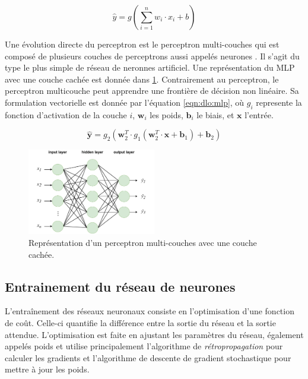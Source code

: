 \begin{equation}
  \label{eqn:dlo:perceptron}
  \hat{y} = g(\sum_{i=1}^{n} w_i \cdot x_i + b)
\end{equation}

Une évolution directe du perceptron est le perceptron multi-couches qui est
composé de plusieurs couches de perceptrons aussi appelés neurones
\cite{rumelhart1986learning}. Il s'agit du type le plus simple de réseau de
neronnes artificiel. Une représentation du \ac{MLP} avec une couche cachée est
donnée dans \cref{fig:dlo:mlp}. Contrairement au perceptron, le perceptron
multicouche peut apprendre une frontière de décision non linéaire. Sa
formulation vectorielle est donnée par l'équation \cref{eqn:dlo:mlp}, où $g_i$
represente la fonction d'activation de la couche $i$, $\mathbf{w}_i$ les poids,
$\mathbf{b}_i$ le biais, et $\mathbf{x}$ l'entrée.

\begin{equation}
  \label{eqn:dlo:mlp}
  \hat{\mathbf{y}} = g_2(\mathbf{w}_2^T \cdot  g_1(\mathbf{w}_2^T \cdot \mathbf{x} + \mathbf{b}_1) + \mathbf{b}_2)
\end{equation}

\begin{figure}[htbp]
  \centering
  \includegraphics[width=0.5\textwidth]{./chapter_dlo/assets/mlp_scheme.pdf}
  \caption{Représentation d'un perceptron multi-couches avec une couche cachée.}
  \label{fig:dlo:mlp}
\end{figure}


\subsection*{Entrainement du réseau de neurones}\label{sec:dlo:training}

L'entraînement des réseaux neuronaux consiste en l'optimisation d'une fonction
de coût. Celle-ci quantifie la différence entre la sortie du réseau et la sortie
attendue. L'optimisation est faite en ajustant les paramètres du réseau,
également appelés poids et utilise principalement l'algorithme de
\emph{rétropropagation} \cite{rumelhart1986learning} pour calculer les gradients
et l'algorithme de descente de gradient stochastique
\cite{robbins1951stochastic} pour mettre à jour les poids.\\

